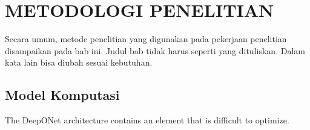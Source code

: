 \chapter{METODOLOGI PENELITIAN}
\label{sec:metodologi_penelitian}

Secara umum, metode penelitian yang digunakan pada pekerjaan penelitian disampaikan pada bab ini. Judul bab tidak harus seperti yang dituliskan. Dalam kata lain bisa diubah sesuai kebutuhan.

\section{Model Komputasi}
\noindent The DeepONet architecture contains an element that is difficult to optimize.


